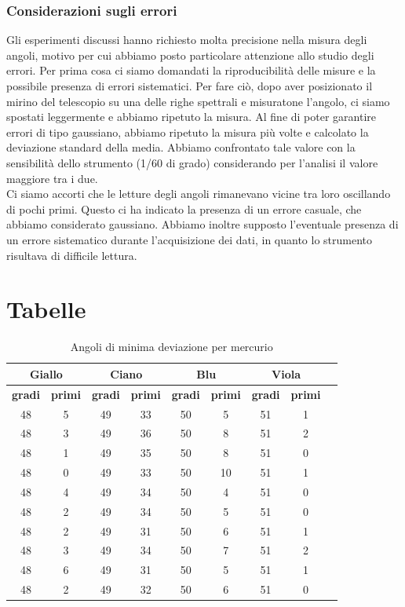 \documentclass[letterpaper,12pt]{article}
\begin{document}
\subsubsection{Considerazioni sugli errori}
Gli esperimenti discussi hanno richiesto molta precisione nella misura degli angoli, motivo per cui abbiamo posto particolare
attenzione allo studio degli errori. Per prima cosa ci siamo domandati la riproducibilità delle misure e la possibile presenza di errori sistematici.
Per fare ciò, dopo aver posizionato il mirino del telescopio su una delle righe spettrali e misuratone l'angolo, ci siamo spostati
leggermente e abbiamo ripetuto la misura. Al fine di poter garantire errori di tipo gaussiano, abbiamo ripetuto la misura
più volte e calcolato la deviazione standard della media. Abbiamo confrontato tale valore con la sensibilità dello strumento (1/60 di grado)
considerando per l'analisi il valore maggiore tra i due. \\
Ci siamo accorti che le letture degli angoli rimanevano vicine tra loro oscillando di pochi primi. Questo ci ha indicato
la presenza di un errore casuale, che abbiamo considerato gaussiano. Abbiamo inoltre supposto l'eventuale presenza di un errore
sistematico durante l'acquisizione dei dati, in quanto lo strumento risultava di difficile lettura. \\ 

\newpage
\section{Tabelle}

\begin{table}[h!]
    \centering
    \begin{tabular}{|c|c|c|c|c|c|c|c|c|}
    \hline
    \multicolumn{2}{|c|}{\textbf{Giallo}} & \multicolumn{2}{|c|}{\textbf{Ciano}} & \multicolumn{2}{|c|}{\textbf{Blu}} & \multicolumn{2}{|c|}{\textbf{Viola}} \\
    \hline
    \textbf{gradi} & \textbf{primi} & \textbf{gradi} & \textbf{primi} & \textbf{gradi} & \textbf{primi} & \textbf{gradi} & \textbf{primi} \\
    \hline
    48 & 5 & 49 & 33 & 50 & 5 & 51 & 1 \\
    48 & 3 & 49 & 36 & 50 & 8 & 51 & 2 \\
    48 & 1 & 49 & 35 & 50 & 8 & 51 & 0 \\
    48 & 0 & 49 & 33 & 50 & 10 & 51 & 1 \\
    48 & 4 & 49 & 34 & 50 & 4 & 51 & 0 \\
    48 & 2 & 49 & 34 & 50 & 5 & 51 & 0 \\
    48 & 2 & 49 & 31 & 50 & 6 & 51 & 1 \\
    48 & 3 & 49 & 34 & 50 & 7 & 51 & 2 \\
    48 & 6 & 49 & 31 & 50 & 5 & 51 & 1 \\
    48 & 2 & 49 & 32 & 50 & 6 & 51 & 0 \\
    \hline
    \end{tabular}
    \caption{Angoli di minima deviazione per mercurio}
    \label{tab:prisma_md}
    \end{table}
\end{document}
